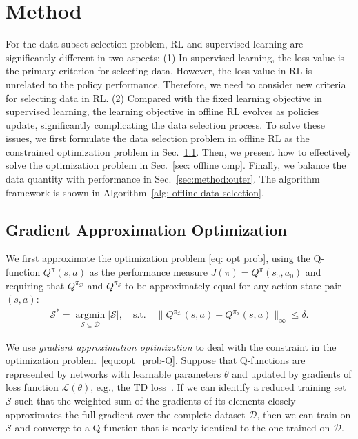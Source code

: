 \section{Method}
For the data subset selection problem, RL and supervised learning are significantly different in two aspects:
(1) In supervised learning, the loss value is the primary criterion for selecting data.
However, the loss value in RL is unrelated to the policy performance.
Therefore, we need to consider new criteria for selecting data in RL.
(2) Compared with the fixed learning objective in supervised learning, the learning objective in offline RL evolves as policies update, significantly complicating the data selection process.
To solve these issues, we first formulate the data selection problem in offline RL as the constrained optimization problem in Sec.~\ref{subsec: grad approx optim}.
Then, we present how to effectively solve the optimization problem in Sec.~\ref{sec: offline omp}.
Finally, we balance the data quantity with performance in Sec.~\ref{sec:method:outer}.
The algorithm framework is shown in Algorithm~\ref{alg: offline data selection}.


\subsection{Gradient Approximation Optimization}
\label{subsec: grad approx optim}

We first approximate the optimization problem \ref{eq: opt prob}, using the Q-function $Q^{\pi}(s,a)$ as the performance measure $J(\pi) = Q^{\pi}(s_0, a_0)$ and requiring that $Q^{\pi_{\mathcal{D}}}$ and $Q^{\pi_{\mathcal{S}}}$ to be approximately equal for any action-state pair $(s,a)$:
\begin{align}
\label{equ:opt_prob-Q}
    \mathcal{S}^* = \mathop{\arg\min}\limits_{\mathcal{S}\subseteq \mathcal{D}}|\mathcal{S}|, \quad
    \text{s.t.} \quad \|Q^{\pi_{\mathcal{D}}}(s,a) - Q^{\pi_{\mathcal{S}}}(s,a) \|_\infty \leq \delta.
\end{align}

We use \emph{gradient approximation optimization} to deal with the constraint in the optimization problem~\ref{equ:opt_prob-Q}. Suppose that Q-functions are represented by networks with learnable parameters $\theta$ and updated by gradients of loss function $\mathcal{L}(\theta)$, e.g., the TD loss~\citep{mnih2015human}. If we can identify a reduced training set $\mathcal{S}$ such that the weighted sum of the gradients of its elements closely approximates the full gradient over the complete dataset $\mathcal{D}$, then we can train on $\mathcal{S}$ and converge to a Q-function that is nearly identical to the one trained on $\mathcal{D}$.

